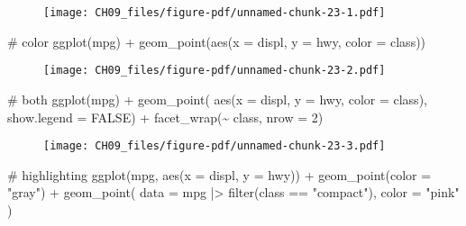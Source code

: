 \documentclass[
  letterpaper,
  DIV=11,
  numbers=noendperiod]{scrreprt}
\newenvironment{Shaded}{\begin{snugshade}}{\end{snugshade}}
\newcommand{\AttributeTok}[1]{\textcolor[rgb]{0.40,0.45,0.13}{#1}}
\newcommand{\CommentTok}[1]{\textcolor[rgb]{0.37,0.37,0.37}{#1}}
\newcommand{\ConstantTok}[1]{\textcolor[rgb]{0.56,0.35,0.01}{#1}}
\newcommand{\DecValTok}[1]{\textcolor[rgb]{0.68,0.00,0.00}{#1}}
\newcommand{\FunctionTok}[1]{\textcolor[rgb]{0.28,0.35,0.67}{#1}}
\newcommand{\NormalTok}[1]{\textcolor[rgb]{0.00,0.23,0.31}{#1}}
\newcommand{\SpecialCharTok}[1]{\textcolor[rgb]{0.37,0.37,0.37}{#1}}
\newcommand{\StringTok}[1]{\textcolor[rgb]{0.13,0.47,0.30}{#1}}
\begin{document}
\begin{enumerate}
\begin{tcolorbox}
  \begin{figure}[H]

  {\centering \texttt{[image: CH09\_files/figure-pdf/unnamed-chunk-23-1.pdf]}

  }

  \end{figure}

\begin{Shaded}
\begin{Highlighting}[]
\CommentTok{\# color}
\FunctionTok{ggplot}\NormalTok{(mpg) }\SpecialCharTok{+} 
  \FunctionTok{geom\_point}\NormalTok{(}\FunctionTok{aes}\NormalTok{(}\AttributeTok{x =}\NormalTok{ displ, }\AttributeTok{y =}\NormalTok{ hwy, }\AttributeTok{color =}\NormalTok{ class))}
\end{Highlighting}
\end{Shaded}

  \begin{figure}[H]

  {\centering \texttt{[image: CH09\_files/figure-pdf/unnamed-chunk-23-2.pdf]}

  }

  \end{figure}

\begin{Shaded}
\begin{Highlighting}[]
\CommentTok{\# both}
\FunctionTok{ggplot}\NormalTok{(mpg) }\SpecialCharTok{+} 
  \FunctionTok{geom\_point}\NormalTok{(}
    \FunctionTok{aes}\NormalTok{(}\AttributeTok{x =}\NormalTok{ displ, }\AttributeTok{y =}\NormalTok{ hwy, }\AttributeTok{color =}\NormalTok{ class), }
    \AttributeTok{show.legend =} \ConstantTok{FALSE}\NormalTok{) }\SpecialCharTok{+} 
 \FunctionTok{facet\_wrap}\NormalTok{(}\SpecialCharTok{\textasciitilde{}}\NormalTok{ class, }\AttributeTok{nrow =} \DecValTok{2}\NormalTok{)}
\end{Highlighting}
\end{Shaded}

  \begin{figure}[H]

  {\centering \texttt{[image: CH09\_files/figure-pdf/unnamed-chunk-23-3.pdf]}

  }

  \end{figure}

\begin{Shaded}
\begin{Highlighting}[]
\CommentTok{\# highlighting}
\FunctionTok{ggplot}\NormalTok{(mpg, }\FunctionTok{aes}\NormalTok{(}\AttributeTok{x =}\NormalTok{ displ, }\AttributeTok{y =}\NormalTok{ hwy)) }\SpecialCharTok{+} 
  \FunctionTok{geom\_point}\NormalTok{(}\AttributeTok{color =} \StringTok{"gray"}\NormalTok{) }\SpecialCharTok{+}
  \FunctionTok{geom\_point}\NormalTok{(}
    \AttributeTok{data =}\NormalTok{ mpg }\SpecialCharTok{|\textgreater{}} \FunctionTok{filter}\NormalTok{(class }\SpecialCharTok{==} \StringTok{"compact"}\NormalTok{),}
    \AttributeTok{color =} \StringTok{"pink"}
\NormalTok{  )}
\end{Highlighting}
\end{Shaded}


\end{tcolorbox}
\end{enumerate}
\end{document}
